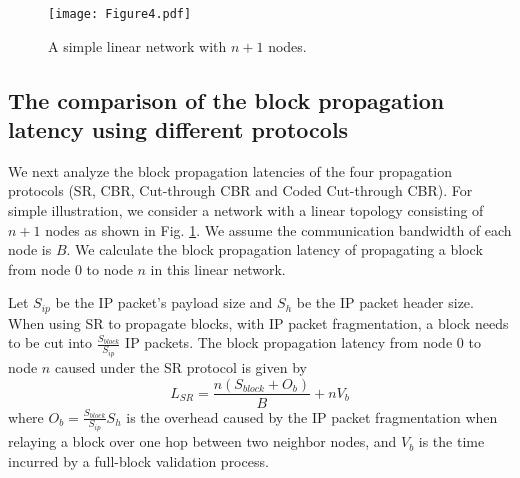 \documentclass[10pt,journal,compsoc]{IEEEtran}
\begin{document}
\begin{figure}[!t]
	\centering
	\texttt{[image: Figure4.pdf]}
	\caption{A simple linear network with $n+1$ nodes.}
	\label{fig_4}
\end{figure}

\subsection{The comparison of the block propagation latency using different protocols}
We next analyze the block propagation latencies of the four propagation protocols (SR, CBR, Cut-through CBR and Coded Cut-through CBR). For simple illustration, we consider a network with a linear topology consisting of 
$n + 1$ nodes as shown in Fig. \ref{fig_4}. We assume the communication bandwidth of each node is $B$. We calculate the block propagation latency of propagating a block from node $0$ to node $n$ in this linear network.

Let ${S_{ip}}$ be the IP packet's payload size and ${S_h}$ be the IP packet header size. When using SR to propagate blocks, with IP packet fragmentation, a block needs to be cut into $\frac{{{S_{block}}}}{{{S_{ip}}}}$ IP packets. The block propagation latency from node $0$ to node $n$ caused under the SR protocol is given by 
\begin{equation}
	\label{eqn:L_SR}
	{L_{SR}} = \frac{{n({S_{block}} + {O_b})}}{B} + n{V_b}
\end{equation}
where ${O_b} = \frac{{{S_{block}}}}{{{S_{ip}}}}{S_h}$ is the overhead caused by the IP packet fragmentation when relaying a block over one hop between two neighbor nodes, and ${V_b}$ is the time incurred by a full-block validation process.
\end{document}
